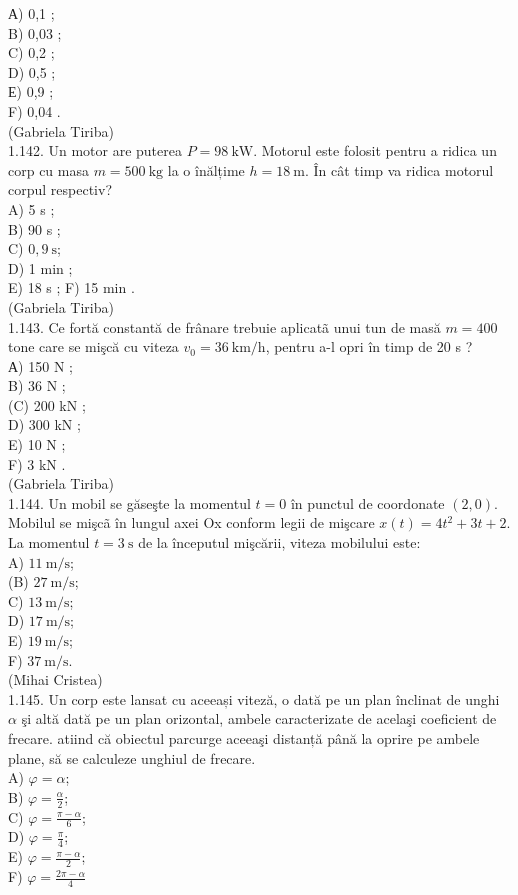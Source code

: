 \documentclass[10pt]{article}
\begin{document}
А) 0,1 ;\\
B) 0,03 ;\\
C) 0,2 ;\\
D) 0,5 ;\\
Е) 0,9 ;\\
F) 0,04 .\\
(Gabriela Tiriba)\\
1.142. Un motor are puterea $P=98 \mathrm{~kW}$. Motorul este folosit pentru a ridica un corp cu masa $m=500 \mathrm{~kg}$ la o înălțime $h=18 \mathrm{~m}$. În cât timp va ridica motorul corpul respectiv?\\
A) 5 s ;\\
B) 90 s ;\\
C) $0,9 \mathrm{~s}$;\\
D) 1 min ;\\
E) 18 s ; F) 15 min .\\
(Gabriela Tiriba)\\
1.143. Ce fortă constantă de frânare trebuie aplicatã unui tun de masă $m=400$ tone care se mişcă cu viteza $v_{0}=36 \mathrm{~km} / \mathrm{h}$, pentru a-l opri în timp de 20 s ?\\
А) 150 N ;\\
B) 36 N ;\\
(C) 200 kN ;\\
D) 300 kN ;\\
E) 10 N ;\\
F) 3 kN .\\
(Gabriela Tiriba)\\
1.144. Un mobil se găseşte la momentul $t=0$ în punctul de coordonate $(2,0)$. Mobilul se mişcã în lungul axei Ox conform legii de mişcare $x(t)=4 t^{2}+3 t+2$. La momentul $t=3 \mathrm{~s}$ de la începutul mişcării, viteza mobilului este:\\
A) $11 \mathrm{~m} / \mathrm{s}$;\\
(B) $27 \mathrm{~m} / \mathrm{s}$;\\
C) $13 \mathrm{~m} / \mathrm{s}$;\\
D) $17 \mathrm{~m} / \mathrm{s}$;\\
E) $19 \mathrm{~m} / \mathrm{s}$;\\
F) $37 \mathrm{~m} / \mathrm{s}$.\\
(Mihai Cristea)\\
1.145. Un corp este lansat cu aceeași viteză, o dată pe un plan înclinat de unghi $\alpha$ şi altă dată pe un plan orizontal, ambele caracterizate de acelaşi coeficient de frecare. atiind că obiectul parcurge aceeaşi distanță până la oprire pe ambele plane, să se calculeze unghiul de frecare.\\
A) $\varphi=\alpha$;\\
B) $\varphi=\frac{\alpha}{2}$;\\
C) $\varphi=\frac{\pi-\alpha}{6}$;\\
D) $\varphi=\frac{\pi}{4}$;\\
E) $\varphi=\frac{\pi-\alpha}{2}$;\\
F) $\varphi=\frac{2 \pi-\alpha}{4}$
\end{document}
